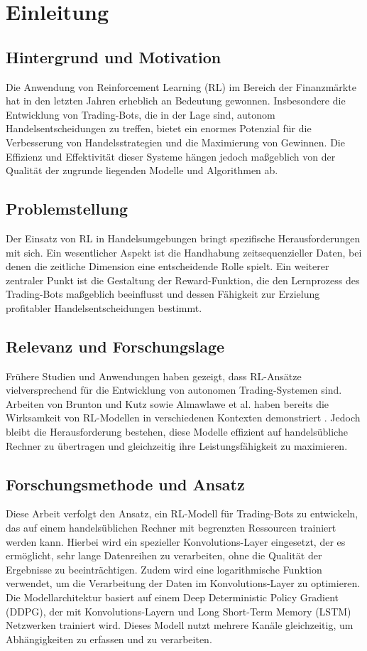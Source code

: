 \chapter{Einleitung}

\section{Hintergrund und Motivation}
Die Anwendung von Reinforcement Learning (RL) im Bereich der Finanzmärkte hat in den letzten Jahren erheblich an Bedeutung gewonnen. Insbesondere die Entwicklung von Trading-Bots, die in der Lage sind, autonom Handelsentscheidungen zu treffen, bietet ein enormes Potenzial für die Verbesserung von Handelsstrategien und die Maximierung von Gewinnen. Die Effizienz und Effektivität dieser Systeme hängen jedoch maßgeblich von der Qualität der zugrunde liegenden Modelle und Algorithmen ab.

\section{Problemstellung}
Der Einsatz von RL in Handelsumgebungen bringt spezifische Herausforderungen mit sich. Ein wesentlicher Aspekt ist die Handhabung zeitsequenzieller Daten, bei denen die zeitliche Dimension eine entscheidende Rolle spielt. Ein weiterer zentraler Punkt ist die Gestaltung der Reward-Funktion, die den Lernprozess des Trading-Bots maßgeblich beeinflusst und dessen Fähigkeit zur Erzielung profitabler Handelsentscheidungen bestimmt.

\section{Relevanz und Forschungslage}
Frühere Studien und Anwendungen haben gezeigt, dass RL-Ansätze vielversprechend für die Entwicklung von autonomen Trading-Systemen sind. Arbeiten von Brunton und Kutz sowie Almawlawe et al. haben bereits die Wirksamkeit von RL-Modellen in verschiedenen Kontexten demonstriert \cite{brunton2019data} \cite{Almawlawe2023}. Jedoch bleibt die Herausforderung bestehen, diese Modelle effizient auf handelsübliche Rechner zu übertragen und gleichzeitig ihre Leistungsfähigkeit zu maximieren.

\section{Forschungsmethode und Ansatz}
Diese Arbeit verfolgt den Ansatz, ein RL-Modell für Trading-Bots zu entwickeln, das auf einem handelsüblichen Rechner mit begrenzten Ressourcen trainiert werden kann. Hierbei wird ein spezieller Konvolutions-Layer eingesetzt, der es ermöglicht, sehr lange Datenreihen zu verarbeiten, ohne die Qualität der Ergebnisse zu beeinträchtigen. Zudem wird eine logarithmische Funktion verwendet, um die Verarbeitung der Daten im Konvolutions-Layer zu optimieren. Die Modellarchitektur basiert auf einem Deep Deterministic Policy Gradient (DDPG), der mit Konvolutions-Layern und Long Short-Term Memory (LSTM) Netzwerken trainiert wird. Dieses Modell nutzt mehrere Kanäle gleichzeitig, um Abhängigkeiten zu erfassen und zu verarbeiten.

